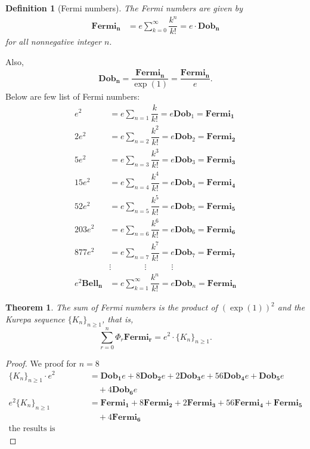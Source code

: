 \documentclass[pdflatex,sn-mathphys-num]{sn-jnl}%
\newtheorem{theorem}{Theorem}
\newtheorem{definition}{Definition}
\theoremstyle{thmstyleone}%
\theoremstyle{thmstyletwo}%
\theoremstyle{thmstylethree}%
\begin{document}
\begin{definition}[Fermi numbers]
The Fermi numbers are given by 
\begin{align*}
     \mathbf{Fermi_{n}}&=e\sum_{k=0}^{\infty}\dfrac{k^n}{k!}= e\cdotp\mathbf{Dob_n }
\end{align*}
    for all nonnegative integer $n.$
\end{definition}
Also, 
\begin{align}
   \mathbf{Dob_n }=\dfrac{\mathbf{Fermi_{n}}}{\exp(1)}=\dfrac{\mathbf{Fermi_{n}}}{e}.
\end{align}
Below are few list of Fermi numbers:
\begin{align*}
    e^2&= e\sum_{n=1}\dfrac{k}{k!}=e\mathbf{Dob}_1= \mathbf{Fermi_{1}}\\ 
    2e^2&= e\sum_{n=2}\dfrac{k^2}{k!}=e\mathbf{Dob}_2= \mathbf{Fermi_{2}}\\ 
    5e^2&=e\sum_{n=3}\dfrac{k^3}{k!}=e\mathbf{Dob}_3= \mathbf{Fermi_{3}}\\ 
    15 e^2&= e\sum_{n=4}\dfrac{k^4}{k!}=e\mathbf{Dob}_4= \mathbf{Fermi_{4}}\\
    52e^2&= e\sum_{n=5}\dfrac{k^5}{k!}=e\mathbf{Dob}_5= \mathbf{Fermi_{5}}\\ 
    203e^2&= e\sum_{n=6}\dfrac{k^6}{k!}=e\mathbf{Dob}_6= \mathbf{Fermi_{6}}\\
    877e^2&= e\sum_{n=7}\dfrac{k^7}{k!}=e\mathbf{Dob}_7= \mathbf{Fermi_{7}} \\
     &\vdots \quad \quad \quad \quad \vdots \quad \quad \quad\vdots \quad \quad \quad \quad \quad \quad \quad\\
    e^2\mathbf{Bell_{n}}&=e\sum_{k=1}^{\infty}\dfrac{k^n}{k!}=e\mathbf{Dob}_{n}= \mathbf{Fermi_{n}}
\end{align*}

\begin{theorem}
The sum of Fermi numbers is the product of $(\exp{(1)})^2$ and the Kurepa sequence $ \lbrace K_n\rbrace_{n\geq 1}$, that is,
$$\sum_{r=0}^{n}\Phi_r\mathbf{Fermi_r}=e^2 \cdotp\lbrace K_n\rbrace_{n\geq 1}.$$
\end{theorem}
\begin{proof}
We proof for $n=8$
\begin{align*} 
  \lbrace K_n\rbrace_{n\geq 1}\cdotp e^2 &= \mathbf{Dob_1}e + 8\mathbf{Dob_2}e + 2\mathbf{Dob_3}e +56\mathbf{Dob_4}e + \mathbf{Dob_5}e \\& \quad + 4\mathbf{Dob_6}e\\ \nonumber
       e^2\lbrace K_n\rbrace_{n\geq 1} & =  \mathbf{Fermi_1} + 8\mathbf{Fermi_2} + 2\mathbf{Fermi_3} +56\mathbf{Fermi_4} + \mathbf{Fermi_5}\\ & \quad + 4\mathbf{Fermi_6}\\
     \mbox{the results is straight forward.} 
\end{align*}
\end{proof}
\end{document}
